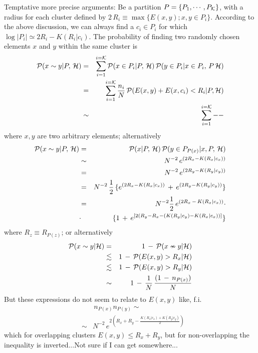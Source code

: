 \documentclass[twocolumn,aps,sort,nofootinbib]{revtex4}
\begin{document}
Temptative more precise arguments: Be a partition 
$P=\{P_1,\cdots ,P_{\cal K}\}$,
with a radius for each cluster defined by 
$2\,R_i\equiv {\max}\{E(x,y);x,y\in P_i\}$. 
According to the above discussion, we can always find a $c_i\in P_i$ for which
$\log|P_i|\simeq 2R_i-K(R_i|c_i)$. The probability of finding two randomly
chosen elements $x$ and $y$ within the same cluster is 
\begin{eqnarray*}
{\cal P}(x \sim y |P,\,{\cal H}) & = & 
\sum_{i=1}^{i={\cal K}}{\cal P}(x\in P_i|P,\,{\cal H})\,{\cal P}(y\in P_{i}|{x\in P_i,\, P\,\cal H}) \\
& = & \sum_{i=1}^{i={\cal K}} \frac{n_i}{N}\,{\cal P}(E(x,y)+E(x,c_i)<R_i|P, {\cal H}) \\
& \sim & \sum_{i=1}^{i={\cal K}} -- %
\end{eqnarray*}
where $x,y$ are two arbitrary elements; alternatively 
\begin{eqnarray*}
{\cal P}(x\sim y|P,\,{\cal H}) & = & {\cal P}(x|P,\,{\cal H})\,{\cal P}(y\in P_{P(x)}|x,P,\,{\cal H})\\
& \sim &N^{-2}\,e^{(2R_x-K(R_x|c_x))} \\
& = &N^{-2}\,e^{(2R_y-K(R_y|c_y))} \\
& = &N^{-2}\,\frac{1}{2}\,\{e^{(2R_x-K(R_x|c_x))}\,+\,e^{(2R_y-K(R_y|c_y))}\} \\
& = &N^{-2}\frac{1}{2}\,e^{(2R_x\, -\, K(R_x|c_x))}\cdot \\
& \cdot & \{1\, +\,e^{\left[2(R_y-R_x-(K(R_y|c_y)-K(R_x|c_x))\right]}\} 
\end{eqnarray*}
where $R_z\equiv R_{P(z)}$; or alternatively 
\begin{eqnarray*}
{\cal P}(x\sim y|{\cal H}) & = & 1\,-\,{\cal P}(x\nsim y|{\cal H}) \\
& \lesssim & 1\,-\,{\cal P}(E(x,y)>R_x|{\cal H})\\
& \lesssim & 1\,-\,{\cal P}(E(x,y)>R_y|{\cal H})\\
& \sim & 1\,-\,\frac{1}{N}\,\frac{(1\,-\,n_{P(x)})}{N} \\
\end{eqnarray*}
But these expressions do not seem to relate to $E(x,y)$ like, f.i.  
\begin{eqnarray*}
&  &\,n_{P(x)}n_{P(y)}\sim \\
& \sim &N^{-2}\,e^{2(R_x+R_y-\frac{K(R_x|c_x)+K(R_y|c_y)}{2})}
\end{eqnarray*}
which for overlapping clusters $E(x,y)\leq R_x+R_y$, but for non-overlapping
the inequality is inverted...Not sure if I can get somewhere...
\end{document}

